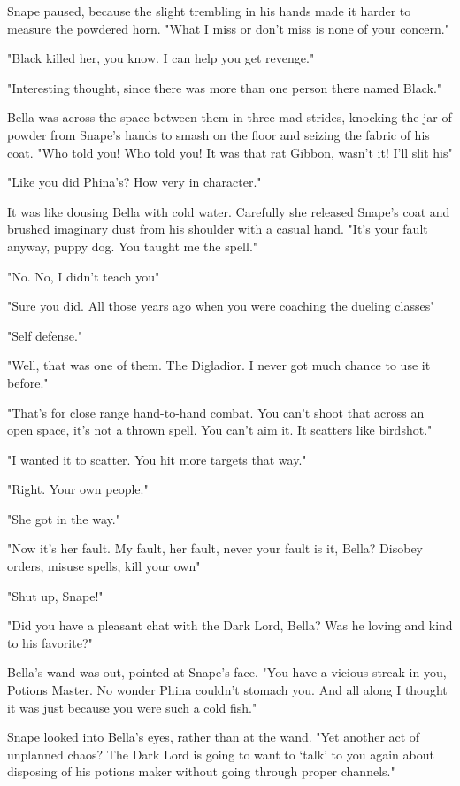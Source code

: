 Snape paused, because the slight trembling in his hands made it harder to measure the powdered horn. "What I miss or don't miss is none of your concern."

"Black killed her, you know. I can help you get revenge."

"Interesting thought, since there was more than one person there named Black."

Bella was across the space between them in three mad strides, knocking the jar of powder from Snape's hands to smash on the floor and seizing the fabric of his coat. "Who told you! Who told you! It was that rat Gibbon, wasn't it! I'll slit his{\el}"

"Like you did Phina's? How very in character."

It was like dousing Bella with cold water. Carefully she released Snape's coat and brushed imaginary dust from his shoulder with a casual hand. "It's your fault anyway, puppy dog. You taught me the spell."

"No. No, I didn't teach you{\el}"

"Sure you did. All those years ago when you were coaching the dueling classes{\el}"

"Self defense."

"Well, that was one of them. The Digladior. I never got much chance to use it before."

"That's for close range hand-to-hand combat. You can't shoot that across an open space, it's not a thrown spell. You can't aim it. It scatters like birdshot."

"I wanted it to scatter. You hit more targets that way."

"Right. Your own people."

"She got in the way."

"Now it's her fault. My fault, her fault, never your fault is it, Bella? Disobey orders, misuse spells, kill your own{\el}"

"Shut up, Snape!"

"Did you have a pleasant chat with the Dark Lord, Bella? Was he loving and kind to his favorite?"

Bella's wand was out, pointed at Snape's face. "You have a vicious streak in you, Potions Master. No wonder Phina couldn't stomach you. And all along I thought it was just because you were such a cold fish."

Snape looked into Bella's eyes, rather than at the wand. "Yet another act of unplanned chaos? The Dark Lord is going to want to `talk' to you again about disposing of his potions maker without going through proper channels."

